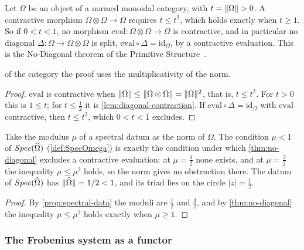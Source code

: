 \begin{theorem}\label{thm:no-diagonal}
Let $\Omega$ be an object of a normed monoidal category, with $t=\norm{\Omega}>0$.  A contractive morphism
$\Omega\otimes\Omega\to\Omega$ requires $t\le t^2$, which holds exactly when $t\ge1$.  So if $0<t<1$, no morphism
$\mathrm{eval}\colon\Omega\otimes\Omega\to\Omega$ is contractive, and in particular no diagonal
$\Delta\colon\Omega\to\Omega\otimes\Omega$ is split, $\mathrm{eval}\circ\Delta=\mathrm{id}_\Omega$, by a contractive
evaluation.  This is the No-Diagonal theorem of the Primitive Structure~\cite{gonzalez25hp}.
\end{theorem}
of the category the proof uses the multiplicativity of the norm.
\begin{proof}
$\mathrm{eval}$ is contractive when $\|\Omega\|\le\|\Omega\otimes\Omega\|=\|\Omega\|^2$, that is, $t\le t^2$.
For $t>0$ this is $1\le t$; for $t\le\tfrac12$ it is \cref{lem:diagonal-contraction}.  If $\mathrm{eval}\circ\Delta=
\mathrm{id}_\Omega$ with $\mathrm{eval}$ contractive, then $t\le t^2$, which $0<t<1$ excludes.
\end{proof}

\begin{corollary}\label{cor:no-diagonal-spectral}
Take the modulus $\mu$ of a spectral datum as the norm of $\Omega$.  The condition $\mu<1$ of $Spec(\widehat{\Omega})$
\textup{(\cref{def:SpecOmega})} is exactly the condition under which \cref{thm:no-diagonal} excludes a contractive
evaluation: at $\mu=\tfrac12$ none exists, and at $\mu=\tfrac32$ the inequality $\mu\le\mu^2$ holds, so the norm
gives no obstruction there.  The datum of $Spec(\widehat{\Omega})$ has $\|\widehat{\Omega}\|=1/2<1$, and its triad lies on the
circle $|z|=\tfrac12$.
\end{corollary}
\begin{proof}
By \cref{prop:spectral-data} the moduli are $\tfrac12$ and $\tfrac32$, and by \cref{thm:no-diagonal} the inequality
$\mu\le\mu^2$ holds exactly when $\mu\ge1$.
\end{proof}

\subsubsection{The Frobenius system as a functor}
\label{ssec:frobenius-functor}

